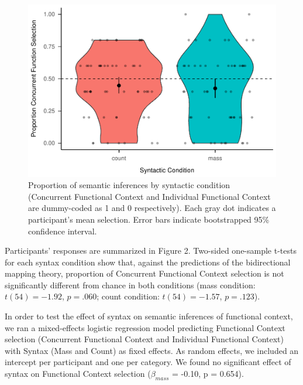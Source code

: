 \documentclass[
  man,floatsintext]{apa6}
\begin{document}
\begin{figure}
\centering
\includegraphics{3_writeup_files/figure-latex/figure1-1.pdf}
\caption{\label{fig:figure1}Proportion of semantic inferences by syntactic condition (Concurrent Functional Context and Individual Functional Context are dummy-coded as 1 and 0 respectively). Each gray dot indicates a participant's mean selection. Error bars indicate bootstrapped 95\% confidence interval.}
\end{figure}

Participants' responses are summarized in Figure 2. Two-sided one-sample t-tests for each syntax condition show that, against the predictions of the bidirectional mapping theory, proportion of Concurrent Functional Context selection is not significantly different from chance in both conditions (mass condition: \(t(54) = -1.92\), \(p = .060\); count condition: \(t(54) = -1.57\), \(p = .123\)).

In order to test the effect of syntax on semantic inferences of functional context, we ran a mixed-effects logistic regression model predicting Functional Context selection (Concurrent Functional Context and Individual Functional Context) with Syntax (Mass and Count) as fixed effects. As random effects, we included an intercept per participant and one per category. We found no significant effect of syntax on Functional Context selection (\(\beta_{mass}\) = -0.10, p = 0.654).
\end{document}

